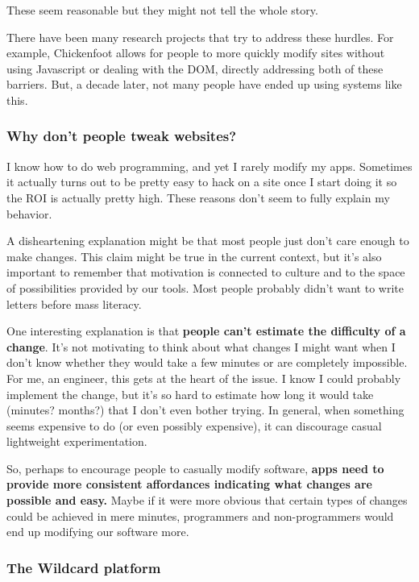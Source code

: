 \documentclass[english,submission]{programming}
\begin{document}
These seem reasonable but they might not tell the whole story.

There have been many research projects that try to address these
hurdles. For example, Chickenfoot \autocite{miller2010} allows for
people to more quickly modify sites without using Javascript or dealing
with the DOM, directly addressing both of these barriers. But, a decade
later, not many people have ended up using systems like this.

\hypertarget{why-dont-people-tweak-websites}{%
\subsubsection{Why don't people tweak
websites?}\label{why-dont-people-tweak-websites}}

I know how to do web programming, and yet I rarely modify my apps.
Sometimes it actually turns out to be pretty easy to hack on a site once
I start doing it so the ROI is actually pretty high. These reasons don't
seem to fully explain my behavior.

A disheartening explanation might be that most people just don't care
enough to make changes. This claim might be true in the current context,
but it's also important to remember that motivation is connected to
culture and to the space of possibilities provided by our tools. Most
people probably didn't want to write letters before mass literacy.

One interesting explanation is that \textbf{people can't estimate the
difficulty of a change}. It's not motivating to think about what changes
I might want when I don't know whether they would take a few minutes or
are completely impossible. For me, an engineer, this gets at the heart
of the issue. I know I could probably implement the change, but it's so
hard to estimate how long it would take (minutes? months?) that I don't
even bother trying. In general, when something seems expensive to do (or
even possibly expensive), it can discourage casual lightweight
experimentation.

So, perhaps to encourage people to casually modify software,
\textbf{apps need to provide more consistent affordances indicating what
changes are possible and easy.} Maybe if it were more obvious that
certain types of changes could be achieved in mere minutes, programmers
and non-programmers would end up modifying our software more.

\hypertarget{the-wildcard-platform}{%
\subsubsection{The Wildcard platform}\label{the-wildcard-platform}}
\end{document}
